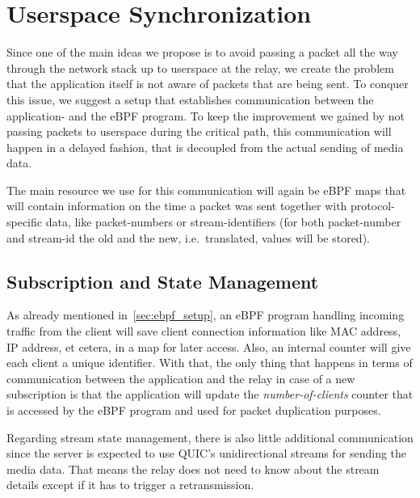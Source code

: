 \section{Userspace Synchronization}\label{sec:userspace_synchronization}

Since one of the main ideas we propose is to avoid passing a packet all the way
through the network stack up to userspace at the relay, we create the 
problem that the application itself is not aware of packets that 
are being sent.
To conquer this issue, we suggest a setup that establishes communication
between the application- and the eBPF program.
To keep the improvement we gained by not passing packets to userspace during the 
critical path, this communication will happen in a delayed fashion, that is 
decoupled from the actual sending of media data.

The main resource we use for this communication will again be eBPF maps that
will contain information on the time a packet was sent together with protocol-specific 
data, like packet-numbers or stream-identifiers (for both packet-number 
and stream-id the old and the new, i.e.~translated, values will be stored).



\subsection{Subscription and State Management}
As already mentioned in~\autoref{sec:ebpf_setup}, an eBPF program handling incoming
traffic from the client will save client connection information like MAC address, IP 
address, et cetera, in a map for later access.
Also, an internal counter will give each client a unique identifier. %
With that, the only thing that happens in terms of communication between the application 
and the relay in case of a new subscription is that the application will update the 
\textit{number-of-clients} counter that is accessed by the eBPF program and used for packet duplication purposes.

Regarding stream state management, there is also little additional communication since the 
server is expected to use QUIC's unidirectional streams for sending the media data. 
That means the relay does not need to know about the stream details except if it 
has to trigger a retransmission.

